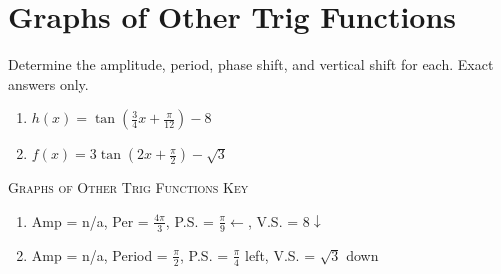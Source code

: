 \chapter{Graphs of Other Trig Functions}

Determine the amplitude, period, phase shift, and vertical shift for each. Exact answers only.

\begin{enumerate}
	\item $h(x) = \tan\left(\frac{3}{4}x + \frac{\pi}{12}\right) - 8$
	\item $f(x)=3\tan\left(2x+\frac{\pi}{2}\right)-\sqrt{3}$
\end{enumerate}

\newpage

\textsc{Graphs of Other Trig Functions Key}

\begin{enumerate}
	\item Amp = n/a, Per = $\frac{4\pi}{3}$, P.S. = $\frac{\pi}{9} \leftarrow$, V.S. = $8 \downarrow$
	\item Amp = n/a, Period = $\frac{\pi}{2}$, P.S. = $\frac{\pi}{4}$ left, V.S. = $\sqrt{3}$ down
\end{enumerate}
